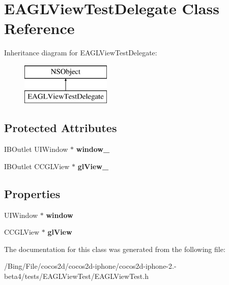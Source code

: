 \hypertarget{interface_e_a_g_l_view_test_delegate}{\section{E\-A\-G\-L\-View\-Test\-Delegate Class Reference}
\label{interface_e_a_g_l_view_test_delegate}
}
Inheritance diagram for E\-A\-G\-L\-View\-Test\-Delegate\-:\begin{figure}[H]
\begin{center}
\leavevmode
\includegraphics[height=2.000000cm]{interface_e_a_g_l_view_test_delegate}
\end{center}
\end{figure}
\subsection*{Protected Attributes}
\begin{DoxyCompactItemize}
\item 
\hypertarget{interface_e_a_g_l_view_test_delegate_aafdc958975dbb2327b7108c040419cac}{I\-B\-Outlet U\-I\-Window $\ast$ {\bfseries window\-\_\-}}\label{interface_e_a_g_l_view_test_delegate_aafdc958975dbb2327b7108c040419cac}

\item 
\hypertarget{interface_e_a_g_l_view_test_delegate_adf2029aee8e3f967f85f0e880976d461}{I\-B\-Outlet C\-C\-G\-L\-View $\ast$ {\bfseries gl\-View\-\_\-}}\label{interface_e_a_g_l_view_test_delegate_adf2029aee8e3f967f85f0e880976d461}

\end{DoxyCompactItemize}
\subsection*{Properties}
\begin{DoxyCompactItemize}
\item 
\hypertarget{interface_e_a_g_l_view_test_delegate_a212d55245d3a93d3d2f707135b88da6b}{U\-I\-Window $\ast$ {\bfseries window}}\label{interface_e_a_g_l_view_test_delegate_a212d55245d3a93d3d2f707135b88da6b}

\item 
\hypertarget{interface_e_a_g_l_view_test_delegate_a317a5118fcf2e551ddc17f4336ba47e3}{C\-C\-G\-L\-View $\ast$ {\bfseries gl\-View}}\label{interface_e_a_g_l_view_test_delegate_a317a5118fcf2e551ddc17f4336ba47e3}

\end{DoxyCompactItemize}


The documentation for this class was generated from the following file\-:\begin{DoxyCompactItemize}
\item 
/\-Bing/\-File/cocos2d/cocos2d-\/iphone/cocos2d-\/iphone-\/2.-\/beta4/tests/\-E\-A\-G\-L\-View\-Test/E\-A\-G\-L\-View\-Test.\-h\end{DoxyCompactItemize}
